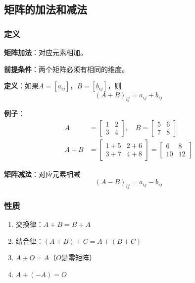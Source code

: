 \documentclass[12pt,a4paper]{article}
\begin{document}
\subsection{矩阵的加法和减法}

\subsubsection{定义}

\textbf{矩阵加法}：对应元素相加。

\textbf{前提条件}：两个矩阵必须有相同的维度。

\textbf{定义}：如果$A = [a_{ij}]$，$B = [b_{ij}]$，则
\begin{equation}
(A + B)_{ij} = a_{ij} + b_{ij}
\end{equation}

\textbf{例子}：
\begin{align}
A &= \begin{bmatrix} 1 & 2 \\ 3 & 4 \end{bmatrix}, \quad
B = \begin{bmatrix} 5 & 6 \\ 7 & 8 \end{bmatrix} \\
A + B &= \begin{bmatrix} 1+5 & 2+6 \\ 3+7 & 4+8 \end{bmatrix} = \begin{bmatrix} 6 & 8 \\ 10 & 12 \end{bmatrix}
\end{align}

\textbf{矩阵减法}：对应元素相减
\begin{equation}
(A - B)_{ij} = a_{ij} - b_{ij}
\end{equation}

\subsubsection{性质}

\begin{enumerate}
\item 交换律：$A + B = B + A$
\item 结合律：$(A + B) + C = A + (B + C)$
\item $A + O = A$（$O$是零矩阵）
\item $A + (-A) = O$
\end{enumerate}
\end{document}
